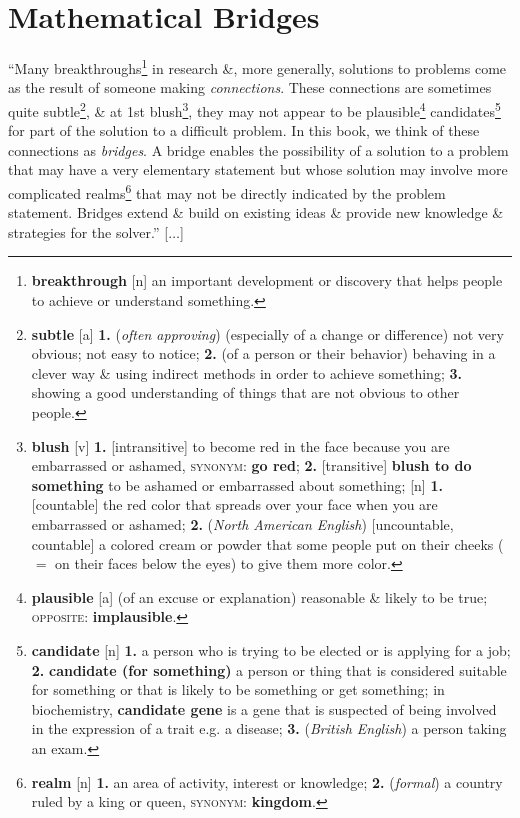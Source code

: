 \documentclass[oneside]{book}
\numberwithin{equation}{section}
\begin{document}
\section{Mathematical Bridges}
``Many breakthroughs\footnote{\textbf{breakthrough} [n] an important development or discovery that helps people to achieve or understand something.} in research \&, more generally, solutions to problems come as the result of someone making \textit{connections}. These connections are sometimes quite subtle\footnote{\textbf{subtle} [a] \textbf{1.} (\textit{often approving}) (especially of a change or difference) not very obvious; not easy to notice; \textbf{2.} (of a person or their behavior) behaving in a clever way \& using indirect methods in order to achieve something; \textbf{3.} showing a good understanding of things that are not obvious to other people.}, \& at 1st blush\footnote{\textbf{blush} [v] \textbf{1.} [intransitive] to become red in the face because you are embarrassed or ashamed, \textsc{synonym}: \textbf{go red}; \textbf{2.} [transitive] \textbf{blush to do something} to be ashamed or embarrassed about something; [n] \textbf{1.} [countable] the red color that spreads over your face when you are embarrassed or ashamed; \textbf{2.} (\textit{North American English}) [uncountable, countable] a colored cream or powder that some people put on their cheeks ($=$ on their faces below the eyes) to give them more color.}, they may not appear to be plausible\footnote{\textbf{plausible} [a] (of an excuse or explanation) reasonable \& likely to be true; \textsc{opposite}: \textbf{implausible}.} candidates\footnote{\textbf{candidate} [n] \textbf{1.} a person who is trying to be elected or is applying for a job; \textbf{2.} \textbf{candidate (for something)} a person or thing that is considered suitable for something or that is likely to be something or get something; in biochemistry, \textbf{candidate gene} is a gene that is suspected of being involved in the expression of a trait e.g. a disease; \textbf{3.} (\textit{British English}) a person taking an exam.} for part of the solution to a difficult problem. In this book, we  think of these connections as \textit{bridges}. A bridge enables the possibility of a solution to a problem that may have a very elementary statement but whose solution may involve more complicated realms\footnote{\textbf{realm} [n] \textbf{1.} an area of activity, interest or knowledge; \textbf{2.} (\textit{formal}) a country ruled by a king or queen, \textsc{synonym}: \textbf{kingdom}.} that may not be directly indicated by the problem statement. Bridges extend \& build on existing ideas \& provide new knowledge \& strategies for the solver.'' [$\ldots$]
\end{document}
